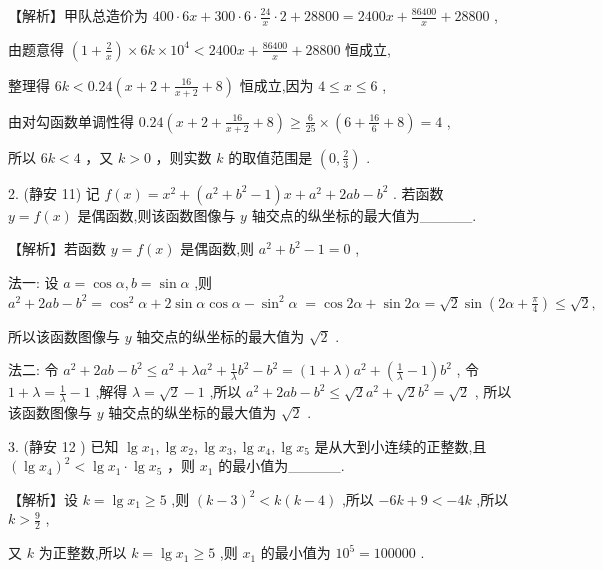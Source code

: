 \documentclass[10pt]{article}
\begin{document}
【解析】甲队总造价为 \({400} \cdot  {6x} + {300} \cdot  6 \cdot  \frac{24}{x} \cdot  2 + {28800} = {2400x} + \frac{86400}{x} + {28800}\) ,

由题意得 \(\left( {1 + \frac{2}{x}}\right)  \times  {6k} \times  {10}^{4} < {2400x} + \frac{86400}{x} + {28800}\) 恒成立,

整理得 \({6k} < {0.24}\left( {x + 2 + \frac{16}{x + 2} + 8}\right)\) 恒成立,因为 \(4 \leq  x \leq  6\) ,

由对勾函数单调性得 \({0.24}\left( {x + 2 + \frac{16}{x + 2} + 8}\right)  \geq  \frac{6}{25} \times  \left( {6 + \frac{16}{6} + 8}\right)  = 4\) ,

所以 \({6k} < 4\) ，又 \(k > 0\) ，则实数 \(k\) 的取值范围是 \(\left( {0,\frac{2}{3}}\right)\) .

2. (静安 11) 记 \(f\left( x\right)  = {x}^{2} + \left( {{a}^{2} + {b}^{2} - 1}\right) x + {a}^{2} + {2ab} - {b}^{2}\) . 若函数 \(y = f\left( x\right)\) 是偶函数,则该函数图像与 \(y\) 轴交点的纵坐标的最大值为\_\_\_\_\_.

【解析】若函数 \(y = f\left( x\right)\) 是偶函数,则 \({a}^{2} + {b}^{2} - 1 = 0\) ,

法一: 设 \(a = \cos \alpha ,b = \sin \alpha\) ,则 \({a}^{2} + {2ab} - {b}^{2} = {\cos }^{2}\alpha  + 2\sin \alpha \cos \alpha  - {\sin }^{2}\alpha \; = \cos {2\alpha } + \sin {2\alpha } = \sqrt{2}\sin \left( {{2\alpha } + \frac{\pi }{4}}\right)  \leq  \sqrt{2},\)

所以该函数图像与 \(y\) 轴交点的纵坐标的最大值为 \(\sqrt{2}\) .

法二: 令 \({a}^{2} + {2ab} - {b}^{2} \leq  {a}^{2} + \lambda {a}^{2} + \frac{1}{\lambda }{b}^{2} - {b}^{2} = \left( {1 + \lambda }\right) {a}^{2} + \left( {\frac{1}{\lambda } - 1}\right) {b}^{2}\) , 令 \(1 + \lambda  = \frac{1}{\lambda } - 1\) ,解得 \(\lambda  = \sqrt{2} - 1\) ,所以 \({a}^{2} + {2ab} - {b}^{2} \leq  \sqrt{2}{a}^{2} + \sqrt{2}{b}^{2} = \sqrt{2}\) , 所以该函数图像与 \(y\) 轴交点的纵坐标的最大值为 \(\sqrt{2}\) .

3. (静安 12 ) 已知 \(\lg {x}_{1},\lg {x}_{2},\lg {x}_{3},\lg {x}_{4},\lg {x}_{5}\) 是从大到小连续的正整数,且 \({\left( \lg {x}_{4}\right) }^{2} < \lg {x}_{1} \cdot  \lg {x}_{5}\) ，则 \({x}_{1}\) 的最小值为\_\_\_\_\_.

【解析】设 \(k = \lg {x}_{1} \geq  5\) ,则 \({\left( k - 3\right) }^{2} < k\left( {k - 4}\right)\) ,所以 \(- {6k} + 9 <  - {4k}\) ,所以 \(k > \frac{9}{2}\) ,

又 \(k\) 为正整数,所以 \(k = \lg {x}_{1} \geq  5\) ,则 \({x}_{1}\) 的最小值为 \({10}^{5} = {100000}\) .
\end{document}
